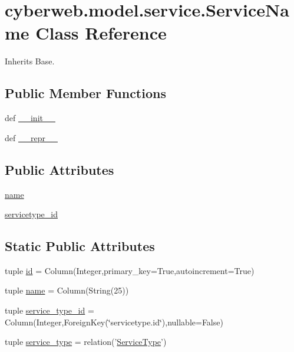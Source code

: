 \hypertarget{classcyberweb_1_1model_1_1service_1_1_service_name}{\section{cyberweb.\-model.\-service.\-Service\-Name \-Class \-Reference}
\label{classcyberweb_1_1model_1_1service_1_1_service_name}
}


\-Inherits \-Base.

\subsection*{\-Public \-Member \-Functions}
\begin{DoxyCompactItemize}
\item 
def \hyperlink{classcyberweb_1_1model_1_1service_1_1_service_name_af0724210c74a6fb32131f9a563c351d0}{\-\_\-\-\_\-init\-\_\-\-\_\-}
\item 
def \hyperlink{classcyberweb_1_1model_1_1service_1_1_service_name_ad6a97ec39aac298de9630615cc7a6c07}{\-\_\-\-\_\-repr\-\_\-\-\_\-}
\end{DoxyCompactItemize}
\subsection*{\-Public \-Attributes}
\begin{DoxyCompactItemize}
\item 
\hyperlink{classcyberweb_1_1model_1_1service_1_1_service_name_a37001950fc1fb2f526cc1e84ba813f56}{name}
\item 
\hyperlink{classcyberweb_1_1model_1_1service_1_1_service_name_aeb5b949fbc24621503feb9d3f9c58deb}{servicetype\-\_\-id}
\end{DoxyCompactItemize}
\subsection*{\-Static \-Public \-Attributes}
\begin{DoxyCompactItemize}
\item 
tuple \hyperlink{classcyberweb_1_1model_1_1service_1_1_service_name_a7545657c6a34f1c11ca622d8363a5ab3}{id} = \-Column(\-Integer,primary\-\_\-key=\-True,autoincrement=\-True)
\item 
tuple \hyperlink{classcyberweb_1_1model_1_1service_1_1_service_name_a17f4f8b445a6a8e4052ceaadbdee0f1e}{name} = \-Column(\-String(25))
\item 
tuple \hyperlink{classcyberweb_1_1model_1_1service_1_1_service_name_aed285922f6a023c535aefd7ecdf1d32e}{service\-\_\-type\-\_\-id} = \-Column(\-Integer,\-Foreign\-Key(\char`\"{}servicetype.\-id\char`\"{}),nullable=\-False)
\item 
tuple \hyperlink{classcyberweb_1_1model_1_1service_1_1_service_name_aea507569f975bb2acec79eb5ec138f0a}{service\-\_\-type} = relation('\hyperlink{classcyberweb_1_1model_1_1service_1_1_service_type}{\-Service\-Type}')
\end{DoxyCompactItemize}



